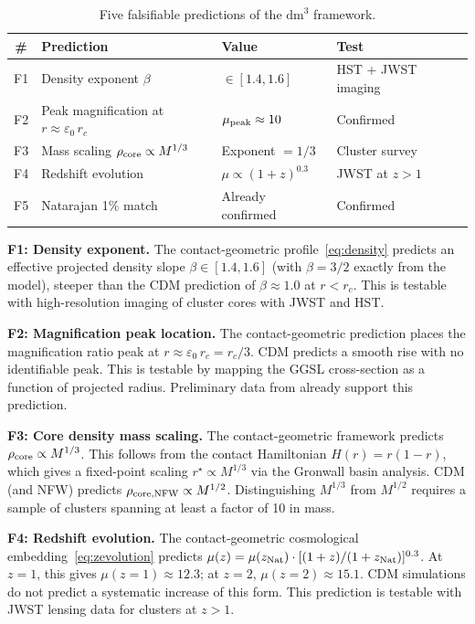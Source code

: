 \documentclass[11pt,a4paper,openright]{book}
\theoremstyle{dm3thm}
\theoremstyle{dm3def}
\newcommand{\dm}{\mathrm{dm}^3}
\newcommand{\eps}{\varepsilon_0}
\newcommand{\rc}{r_c}
\begin{document}
\begin{table}[h]
\centering
\caption{Five falsifiable predictions of the $\dm$ framework.}
\label{tab:predictions}
\begin{tabular}{clll}
\toprule
\# & Prediction & Value & Test \\
\midrule
F1 & Density exponent $\beta$ & $\in [1.4,1.6]$ & HST + JWST imaging \\
F2 & Peak magnification at $r \approx \eps\,\rc$ & $\mu_{\rm peak} \approx 10$ & Confirmed \\
F3 & Mass scaling $\rho_{\rm core}\propto M^{1/3}$ & Exponent $= 1/3$ & Cluster survey \\
F4 & Redshift evolution & $\mu \propto (1+z)^{0.3}$ & JWST at $z>1$ \\
F5 & Natarajan 1\% match & Already confirmed & Confirmed \\
\bottomrule
\end{tabular}
\end{table}

\medskip
\noindent\textbf{F1: Density exponent.}
The contact-geometric profile~\eqref{eq:density} predicts an effective
projected density slope $\beta \in [1.4, 1.6]$ (with $\beta = 3/2$ exactly
from the model), steeper than the CDM prediction of $\beta \approx 1.0$ at
$r < \rc$.  This is testable with high-resolution imaging of cluster cores
with JWST and HST.

\medskip
\noindent\textbf{F2: Magnification peak location.}
The contact-geometric prediction places the magnification ratio peak at
$r \approx \eps\,\rc = \rc/3$.  CDM predicts a smooth rise with no
identifiable peak.  This is testable by mapping the GGSL cross-section as
a function of projected radius.  Preliminary data from
\citet{NatarajanChiangDutra2026} already support this prediction.

\medskip
\noindent\textbf{F3: Core density mass scaling.}
The contact-geometric framework predicts $\rho_{\rm core} \propto M^{1/3}$.
This follows from the contact Hamiltonian $H(r) = r(1-r)$, which gives a
fixed-point scaling $r^\star \propto M^{1/3}$ via the Gronwall basin analysis.
CDM (and NFW) predicts $\rho_{\rm core,NFW} \propto M^{1/2}$.  Distinguishing
$M^{1/3}$ from $M^{1/2}$ requires a sample of clusters spanning at least a
factor of 10 in mass.

\medskip
\noindent\textbf{F4: Redshift evolution.}
The contact-geometric cosmological embedding~\eqref{eq:zevolution} predicts
$\mu(z) = \mu(z_{\rm Nat})\cdot[(1+z)/(1+z_{\rm Nat})]^{0.3}$.  At $z=1$,
this gives $\mu(z=1) \approx 12.3$; at $z=2$, $\mu(z=2) \approx 15.1$.
CDM simulations do not predict a systematic increase of this form.
This prediction is testable with JWST lensing data for clusters at $z>1$.
\end{document}
